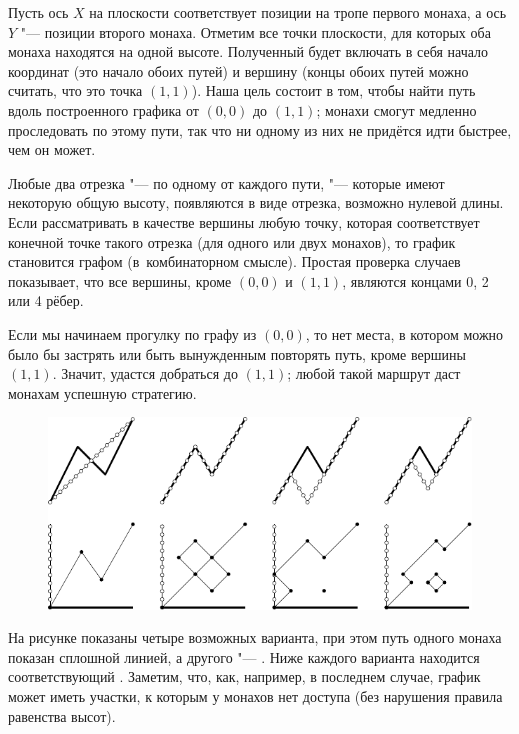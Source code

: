 \documentclass[twoside]{book}
\begin{document}
Пусть ось $X$ на плоскости соответствует позиции на тропе первого монаха, а ось $Y$ "--- позиции второго монаха.
Отметим все точки плоскости, для которых оба монаха находятся на одной высоте.
Полученный  будет включать в себя начало координат (это начало обоих путей) и вершину (концы обоих путей\change{,}{;} можно считать, что это точка $(1,1)$).
Наша цель состоит в том, чтобы найти путь вдоль построенного графика от $(0,0)$ до $(1,1)$;
монахи смогут медленно проследовать по этому пути, так что ни одному из них не придётся идти быстрее, чем он может.

Любые два отрезка "--- по одному от каждого пути, "--- которые имеют некоторую общую высоту, появляются  в виде отрезка, возможно нулевой длины.
Если рассматривать в качестве вершины любую точку, которая соответствует конечной точке такого отрезка (для одного или двух монахов), то график становится графом (в~комбинаторном смысле).
Простая проверка случаев показывает, что все вершины, кроме $(0,0)$ и $(1,1)$, являются концами 0, 2 или 4 рёбер.


Если мы начинаем прогулку по графу из  $(0,0)$, то нет места, в котором можно было бы застрять или быть вынужденным повторять путь, кроме вершины $(1,1)$.
Значит, удастся добраться до  $(1,1)$; любой такой маршрут даст монахам успешную стратегию.
\heart

\begin{figure}[h]
\centering
 \includegraphics{mp/wink-27}
\end{figure} 


На рисунке показаны четыре возможных варианта, при этом путь одного монаха показан сплошной линией, а другого "--- .
Ниже каждого варианта находится соответствующий .
Заметим, что, как, например, в последнем случае, график может иметь участки, к которым у монахов нет доступа (без нарушения правила равенства высот).
\end{document}
